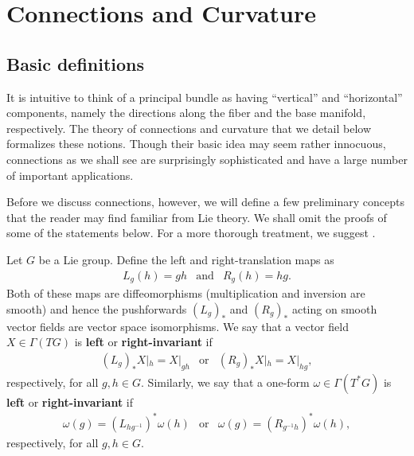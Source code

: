 \chapter{Connections and Curvature}

\section{Basic definitions}

It is intuitive to think of a principal bundle as having ``vertical''  and ``horizontal'' components, namely the directions along the fiber and the base manifold,
respectively. The theory of connections and curvature that we detail below formalizes these notions. Though their basic idea may seem rather
innocuous, connections as we shall see are surprisingly sophisticated and have a large number of important applications. 

Before we discuss connections, however, we will define a few preliminary concepts that the reader may find familiar from Lie theory.
We shall omit the proofs of some of the statements below. For a more thorough treatment, we suggest .

\begin{defn}
    Let $G$ be a Lie group. Define the left and right-translation maps as
    \[
        \begin{array}{ccc}
            L_g(h)=gh & \text{and} & R_g(h)=hg.
        \end{array}
    \]
    Both of these maps are diffeomorphisms (multiplication and inversion are smooth) and hence the pushforwards $(L_g)_*$ and $(R_g)_*$
    acting on smooth vector fields are vector space isomorphisms. We say that a vector field $X\in\Gamma(TG)$ is \textbf{left} or \textbf{right-invariant} if
    \[
        \begin{array}{ccc}
            (L_g)_*X|_h=X|_{gh} & \text{or} & (R_g)_*X|_h=X|_{hg},
        \end{array}
    \]
    respectively, for all $g,h\in G$.
    Similarly, we say that a one-form $\omega\in\Gamma(T^*G)$ is \textbf{left} or \textbf{right-invariant} if
    \[
        \begin{array}{ccc}
            \omega(g)=\left( L_{hg^{-1}} \right)^*\omega(h) & \text{or} & \omega(g)=\left( R_{g^{-1}h} \right)^*\omega(h),
        \end{array}
    \]
    respectively, for all $g,h\in G$.
\end{defn}

